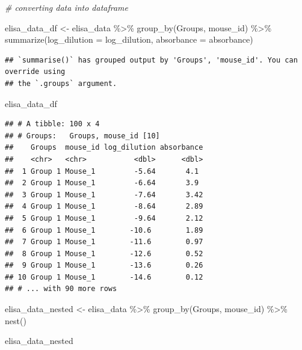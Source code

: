\documentclass[
]{book}
\newenvironment{Shaded}{\begin{snugshade}}{\end{snugshade}}
\newcommand{\AttributeTok}[1]{\textcolor[rgb]{0.77,0.63,0.00}{#1}}
\newcommand{\CommentTok}[1]{\textcolor[rgb]{0.56,0.35,0.01}{\textit{#1}}}
\newcommand{\FunctionTok}[1]{\textcolor[rgb]{0.00,0.00,0.00}{#1}}
\newcommand{\NormalTok}[1]{#1}
\newcommand{\OtherTok}[1]{\textcolor[rgb]{0.56,0.35,0.01}{#1}}
\newcommand{\SpecialCharTok}[1]{\textcolor[rgb]{0.00,0.00,0.00}{#1}}
\begin{document}
\begin{Shaded}
\begin{Highlighting}[]
\CommentTok{\# converting data into dataframe}

\NormalTok{elisa\_data\_df }\OtherTok{\textless{}{-}}\NormalTok{ elisa\_data }\SpecialCharTok{\%\textgreater{}\%} 
  \FunctionTok{group\_by}\NormalTok{(Groups, mouse\_id) }\SpecialCharTok{\%\textgreater{}\%} 
  \FunctionTok{summarize}\NormalTok{(}\AttributeTok{log\_dilution =}\NormalTok{ log\_dilution, }\AttributeTok{absorbance =}\NormalTok{ absorbance)}
\end{Highlighting}
\end{Shaded}

\begin{verbatim}
## `summarise()` has grouped output by 'Groups', 'mouse_id'. You can override using
## the `.groups` argument.
\end{verbatim}

\begin{Shaded}
\begin{Highlighting}[]
\NormalTok{elisa\_data\_df}
\end{Highlighting}
\end{Shaded}

\begin{verbatim}
## # A tibble: 100 x 4
## # Groups:   Groups, mouse_id [10]
##    Groups  mouse_id log_dilution absorbance
##    <chr>   <chr>           <dbl>      <dbl>
##  1 Group 1 Mouse_1         -5.64       4.1 
##  2 Group 1 Mouse_1         -6.64       3.9 
##  3 Group 1 Mouse_1         -7.64       3.42
##  4 Group 1 Mouse_1         -8.64       2.89
##  5 Group 1 Mouse_1         -9.64       2.12
##  6 Group 1 Mouse_1        -10.6        1.89
##  7 Group 1 Mouse_1        -11.6        0.97
##  8 Group 1 Mouse_1        -12.6        0.52
##  9 Group 1 Mouse_1        -13.6        0.26
## 10 Group 1 Mouse_1        -14.6        0.12
## # ... with 90 more rows
\end{verbatim}

\begin{Shaded}
\begin{Highlighting}[]
\NormalTok{elisa\_data\_nested }\OtherTok{\textless{}{-}}\NormalTok{ elisa\_data }\SpecialCharTok{\%\textgreater{}\%}
  \FunctionTok{group\_by}\NormalTok{(Groups, mouse\_id) }\SpecialCharTok{\%\textgreater{}\%}
  \FunctionTok{nest}\NormalTok{()}

\NormalTok{elisa\_data\_nested}
\end{Highlighting}
\end{Shaded}
\end{document}
